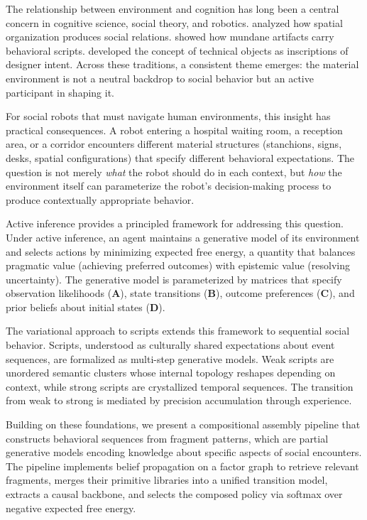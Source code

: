 \documentclass[11pt,a4paper]{article}
\newcommand{\A}{\mathbf{A}}
\newcommand{\B}{\mathbf{B}}
\newcommand{\CC}{\mathbf{C}}
\newcommand{\D}{\mathbf{D}}
\begin{document}
The relationship between environment and cognition has long been a central concern in cognitive science, social theory, and robotics.  \citet{lefebvre1991production} analyzed how spatial organization produces social relations.  \citet{latour1992missing} showed how mundane artifacts carry behavioral scripts.  \citet{akrich1992description} developed the concept of technical objects as inscriptions of designer intent.  Across these traditions, a consistent theme emerges: the material environment is not a neutral backdrop to social behavior but an active participant in shaping it.

For social robots that must navigate human environments, this insight has practical consequences.  A robot entering a hospital waiting room, a reception area, or a corridor encounters different material structures (stanchions, signs, desks, spatial configurations) that specify different behavioral expectations.  The question is not merely \emph{what} the robot should do in each context, but \emph{how} the environment itself can parameterize the robot's decision-making process to produce contextually appropriate behavior.

Active inference \citep{friston2017active,dacosta2020active,parr2022active} provides a principled framework for addressing this question.  Under active inference, an agent maintains a generative model of its environment and selects actions by minimizing expected free energy, a quantity that balances pragmatic value (achieving preferred outcomes) with epistemic value (resolving uncertainty).  The generative model is parameterized by matrices that specify observation likelihoods ($\A$), state transitions ($\B$), outcome preferences ($\CC$), and prior beliefs about initial states ($\D$).

The variational approach to scripts \citep{albarracin2021variational} extends this framework to sequential social behavior.  Scripts, understood as culturally shared expectations about event sequences, are formalized as multi-step generative models.  Weak scripts are unordered semantic clusters whose internal topology reshapes depending on context, while strong scripts are crystallized temporal sequences.  The transition from weak to strong is mediated by precision accumulation through experience.

Building on these foundations, we present a compositional assembly pipeline that constructs behavioral sequences from fragment patterns, which are partial generative models encoding knowledge about specific aspects of social encounters.  The pipeline implements belief propagation on a factor graph to retrieve relevant fragments, merges their primitive libraries into a unified transition model, extracts a causal backbone, and selects the composed policy via softmax over negative expected free energy.
\end{document}
